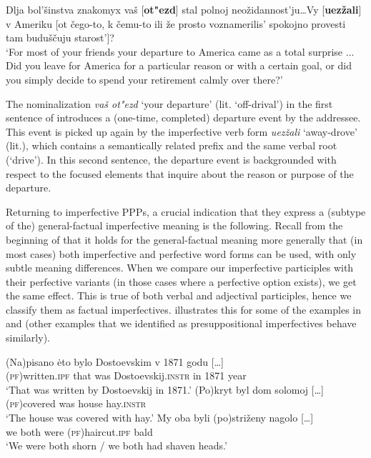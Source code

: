 \documentclass[output=paper,
modfonts,
newtxmath,
hidelinks
]{langscibook}
\begin{document}
\ea Dlja bol'šinstva znakomyx vaš [\textbf{ot"ezd}] stal polnoj  neožidannost'ju\dots Vy [\textbf{uezžali}] v Ameriku [ot čego-to, k čemu-to ili že
	prosto voznamerilis' spokojno provesti tam buduščuju starost']?\\
`For most of your friends your departure to America came as a total surprise ... Did you leave for America for a particular reason or with a certain goal, or did you simply decide to spend your retirement calmly over there?'\label{departure}\hfill \citep[][207f.]{gronndiss}
\z

\noindent The nominalization \textit{vaš ot"ezd} `your departure' (lit. `off-drival') in the first sentence of  introduces a (one-time, completed) departure event by the addressee. This event is picked up again by the imperfective verb form \textit{uezžali} `away-drove' (lit.), which contains a semantically related prefix and the same verbal root (`drive'). In this second sentence, the departure event is backgrounded with respect to the focused elements that inquire about the reason or purpose of the departure. 

Returning to imperfective PPPs, a crucial indication that they express a (subtype of the) general-factual imperfective meaning is the following. Recall from the beginning of  that it holds for the general-factual meaning more generally that (in most cases) both imperfective and perfective word forms can be used, with only subtle meaning differences. When we compare our imperfective participles with their perfective variants (in those cases where a perfective option exists), we get the same effect. This is true of both verbal and adjectival participles, hence we classify them as factual imperfectives.  illustrates this for some of the examples in  and  (other examples that we identified as presuppositional imperfectives behave similarly). 

\ea\label{pisanoPF}
\ea\gll	(Na)pisano \.{e}to bylo Dostoevskim v 1871 godu [\dots]\\ 
	(\textsc{pf})written.\textsc{ipf} that was Dostoevskij.\textsc{instr} in 1871 year \\
\glt	`That was written by Dostoevskij in 1871.'
\ex\gll	(Po)kryt byl dom solomoj [\dots]\\ 		
	\textsc{(pf)}covered was house hay.\textsc{instr} 	\\
\glt	`The house was covered with hay.'
\ex\gll	My oba byli (po)striženy nagolo [\dots]\\
	we both were (\textsc{pf})haircut.\textsc{ipf} bald\\
\glt	`We were both shorn / we both had shaven heads.'
\z\z
\end{document}
